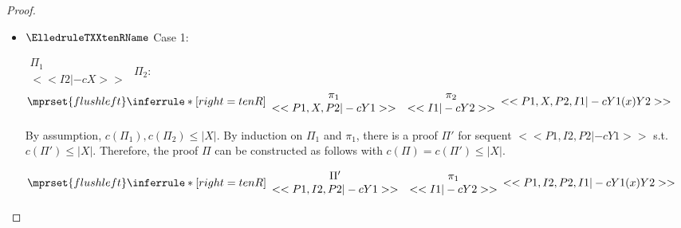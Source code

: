 \begin{proof}
\begin{enumerate}
\begin{itemize}
  \item $\ElledruleTXXtenRName$ Case 1:
      \begin{center}
        \scriptsize
        \begin{math}
          \begin{array}{c}
            \Pi_1 \\
            {<<I2 |-c X>>}
          \end{array}
        \end{math}
        \qquad\qquad
        $\Pi_2$:
        \begin{math}
          $$\mprset{flushleft}
          \inferrule* [right={\tiny tenR}] {
            {
              \begin{array}{cc}
                \pi_1 & \pi_2 \\
                {<<P1, X, P2 |-c Y1>>} & {<<I1 |-c Y2>>}
              \end{array}
            }
          }{<<P1, X, P2, I1 |-c Y1 (x) Y2>>}
        \end{math}
      \end{center}
      By assumption, $c(\Pi_1),c(\Pi_2)\leq |X|$. By induction on $\Pi_1$ and $\pi_1$, there
      is a proof $\Pi'$ for sequent $<<P1, I2, P2 |-c Y1>>$ s.t. $c(\Pi') \leq |X|$.
      Therefore, the proof $\Pi$ can be constructed as follows with
      $c(\Pi) = c(\Pi') \leq |X|$.
      \begin{center}
        \scriptsize
        \begin{math}
          $$\mprset{flushleft}
          \inferrule* [right={\tiny tenR}] {
            {
              \begin{array}{cc}
                \Pi' & \pi_1 \\
                {<<P1, I2, P2 |-c Y1>>} & {<<I1 |-c Y2>>}
              \end{array}
            }
          }{<<P1, I2, P2, I1 |-c Y1 (x) Y2>>}
        \end{math}
      \end{center}


\end{itemize}
\end{enumerate}
\end{proof}
